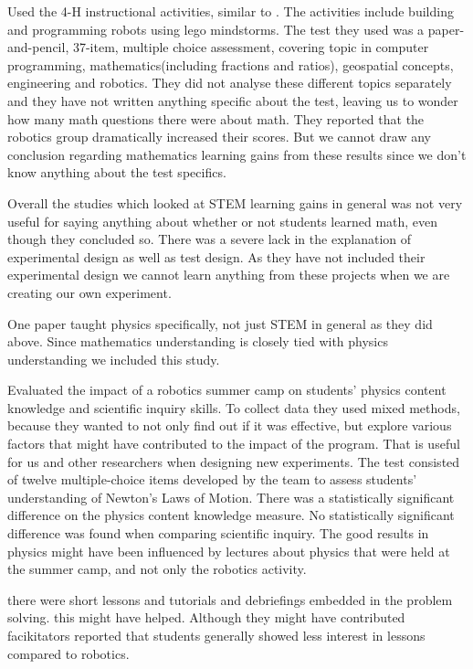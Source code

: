 \bigskip\noindent
\cite{nugent2009use} Used the 4-H instructional activities, similar to \cite{nugent2008effect}. The activities include building and programming robots using lego mindstorms. The test they used was a paper-and-pencil, 37-item, multiple choice assessment, covering topic in computer programming, mathematics(including fractions and ratios), geospatial concepts, engineering and robotics. They did not analyse these different topics separately and they have not written anything specific about the test, leaving us to wonder how many math questions there were about math. They reported that the robotics group dramatically increased their scores. But we cannot draw any conclusion regarding mathematics learning gains from these results since we don’t know anything about the test specifics.

\bigskip\noindent
Overall the studies which looked at STEM learning gains in general was not very useful for saying anything about whether or not students learned math, even though they concluded so. There was a severe lack in the explanation of experimental design as well as test design. As they have not included their experimental design we cannot learn anything from these projects when we are creating our own experiment. 

\bigskip\noindent
One paper taught physics specifically, not just STEM in general as they did above. Since mathematics understanding is closely tied with physics understanding we included this study.

\bigskip\noindent
\cite{williams2007acquisition} Evaluated the impact of a robotics summer camp on students’ physics content knowledge and scientific inquiry skills. To collect data they used mixed methods, because they wanted to not only find out if it was effective, but explore various factors that might have contributed to the impact of the program. That is useful for us and other researchers when designing new experiments. The test consisted of twelve multiple-choice items developed by the team to assess students’ understanding of Newton’s Laws of Motion. There was a statistically significant difference on the physics content knowledge measure. No statistically significant difference was found when comparing scientific inquiry. The good results in physics might have been influenced by lectures about physics that were held at the summer camp, and not only the robotics activity. 

\bigskip\noindent
\cite{williams2007acquisition} there were short lessons and tutorials and debriefings embedded in the problem solving. this might have helped. Although they might have contributed facikitators reported that students generally showed less interest in lessons compared to robotics. 

